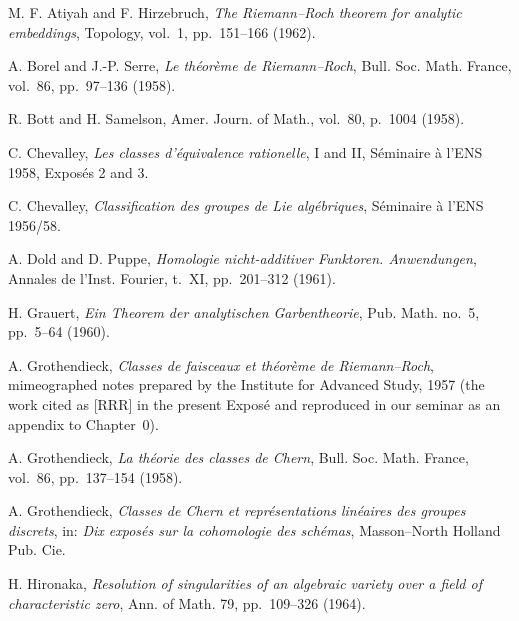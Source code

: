 \begin{enumerate}[label={[\arabic*]},leftmargin=3.2em]
\item M. F. Atiyah and F. Hirzebruch,
  \emph{The Riemann--Roch theorem for analytic embeddings},
  Topology, vol.~1, pp.~151--166 (1962).

\item A. Borel and J.-P. Serre,
  \emph{Le th\'eor\`eme de Riemann--Roch},
  Bull. Soc. Math. France, vol.~86, pp.~97--136 (1958).

\item R. Bott and H. Samelson,
  Amer. Journ. of Math., vol.~80, p.~1004 (1958).

\item C. Chevalley,
  \emph{Les classes d'\'equivalence rationelle}, I and II,
  S\'eminaire \`a l'ENS 1958, Expos\'es 2 and 3.

\item C. Chevalley,
  \emph{Classification des groupes de Lie alg\'ebriques},
  S\'eminaire \`a l'ENS 1956/58.

\item A. Dold and D. Puppe,
  \emph{Homologie nicht-additiver Funktoren. Anwendungen},
  Annales de l'Inst. Fourier, t.~XI, pp.~201--312 (1961).

\item H. Grauert,
  \emph{Ein Theorem der analytischen Garbentheorie},
  Pub. Math. no.~5, pp.~5--64 (1960).

\item A. Grothendieck,
  \emph{Classes de faisceaux et th\'eor\`eme de Riemann--Roch},
  mimeographed notes prepared by the Institute for Advanced Study, 1957
  (the work cited as [RRR] in the present Expos\'e and reproduced in our
  seminar as an appendix to Chapter~0).

\item A. Grothendieck,
  \emph{La th\'eorie des classes de Chern},
  Bull. Soc. Math. France, vol.~86, pp.~137--154 (1958).

\item A. Grothendieck,
  \emph{Classes de Chern et repr\'esentations lin\'eaires des groupes
  discrets}, in: \emph{Dix expos\'es sur la cohomologie des sch\'emas},
  Masson--North Holland Pub. Cie.

\item H. Hironaka,
  \emph{Resolution of singularities of an algebraic variety over a field of
  characteristic zero}, Ann. of Math. 79, pp.~109--326 (1964).


\end{enumerate}
